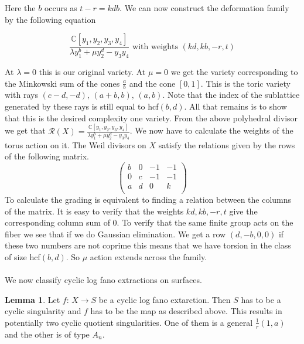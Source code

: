 \documentclass[11pt]{amsart}
\theoremstyle{definition}
\theoremstyle{definition}
\theoremstyle{definition}
\theoremstyle{definition}
\theoremstyle{definition}
\newtheorem{lem}[thm]{Lemma}
\theoremstyle{definition}
\theoremstyle{definition}
\theoremstyle{definition}
\begin{document}
Here the $b$ occurs as $t-r = kdb$. We can now construct the deformation family by the following equation

\[
\frac{\mathbb{C}[y_1, y_2, y_3,  y_4]}{\lambda y_1^b  + \mu y_2^d - y_3 y_4} \text{  with weights } (kd, kb, -r, t)
\]

At $\lambda = 0$ this is our original variety. At $\mu = 0$ we get the variety corresponding to the Minkowski sum of the cones $\frac{a}{b}$ and the cone $\left[ 0, 1 \right]$. This is the toric variety with rays $(c-d,-d), \, (a+b, b), \, (a,b)$. Note that the index of the sublattice generated by these rays is still equal to hcf$(b, d)$. All that remains is to show that this is the desired complexity one variety. From the above polyhedral divisor we get that $\mathcal{R}(X) =\frac{\mathbb{C}[y_1, y_2, y_3,  y_4]}{\lambda y_1^b  + \mu y_2^d - y_3 y_4}$. We now have to calculate the weights of the torus action on it. The Weil divisors on $X$ satisfy the relations given by the rows of the following matrix. 
\[
 \left(
 \begin{array}{cccc}
b & 0 & -1 & -1  \\
0 & c & -1 & -1 \\
a & d & 0  & k \\
\end{array}
\right) 
\]
To calculate the grading is equivalent to finding a relation between the columns of the matrix. It is easy to verify that the weights $kd,kb,-r,t$ give the corresponding column sum of 0. To verify that the same finite group acts on the fiber we see that if we do Gaussian elimination. We get a row $(d, -b, 0 ,0)$ if these two numbers are not coprime this means that we have torsion in the class of size hcf$(b,d)$. So $\mathbb{\mu}$ action extends across the family. 
\\
\\
We now classify cyclic log fano extractions on surfaces.
\begin{lem}
Let $f: \, X \rightarrow S$ be a cyclic log fano extarction. Then $S$ has to be a cyclic singularity and $f$ has to be the map as described above. This results in potentially two cyclic quotient singularities. One of them is a general $\frac{1}{r} (1, a)$ and the other is of type $A_n$.
\end{lem}
\end{document}
